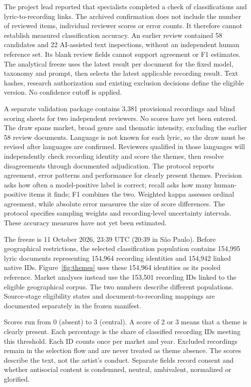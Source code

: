 \documentclass[10pt,a4paper,twocolumn]{article}
\begin{document}
The project lead reported that specialists completed a check of classifications and lyric-to-recording links. The archived confirmation does not include the number of reviewed items, individual reviewer scores or error counts. It therefore cannot establish measured classification accuracy. An earlier review contained 58 candidates and 22 AI-assisted text inspections, without an independent human reference set. Its blank review fields cannot support agreement or F1 estimates. The analytical freeze uses the latest result per document for the fixed model, taxonomy and prompt, then selects the latest applicable recording result. Text hashes, research authorization and existing exclusion decisions define the eligible version. No confidence cutoff is applied.

A separate validation package contains 3,381 provisional recordings and blind scoring sheets for two independent reviewers. No scores have yet been entered. The draw spans market, broad genre and thematic intensity, excluding the earlier 58 review documents. Language is not known for each lyric, so the draw must be revised after languages are confirmed. Reviewers qualified in those languages will independently check recording identity and score the themes, then resolve disagreements through documented adjudication. The protocol reports agreement, error patterns and performance for clearly present themes. Precision asks how often a model-positive label is correct; recall asks how many human-positive items it finds; F1 combines the two. Weighted kappa assesses ordinal agreement, while absolute error measures the size of score differences. The protocol specifies sampling weights and recording-level uncertainty intervals. These accuracy measures have not yet been estimated.

The freeze is 11 October 2026, 23:39 UTC (20:39 in S\~ao Paulo). Before geographical restrictions, the selected classification population contains 154,995 lyric documents representing 154,964 recording identities and 154,942 linked native IDs. Figure~\ref{fig:themes} uses these 154,964 identities as its pooled reference. Market analyses instead use the 153,501 recording IDs linked to the eligible geographical corpus. The two numbers describe different populations. Source-stage eligibility states and document-to-recording mappings are documented separately in the frozen manifest.

Scores run from 0 (absent) to 3 (central). A score of 2 or 3 means that a theme is clearly present. Each percentage is the share of classified recording IDs meeting this threshold. Each ID counts once per market and year. Excluded recordings remain in the selection flow and are never treated as theme absence. The scores describe the text, not the artist's conduct. Separate fields record consent and whether antisocial content is condemned, neutral, ambivalent, normalized or glorified.
\end{document}
